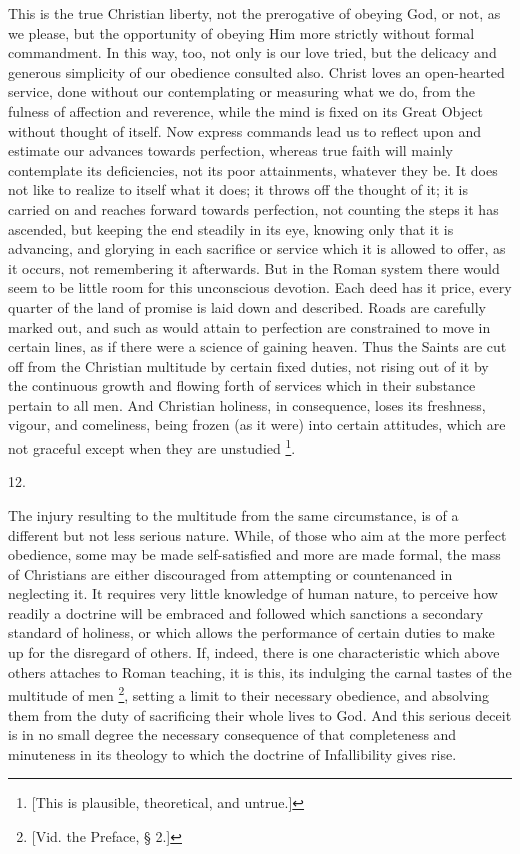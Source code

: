 This is the true Christian liberty, not the prerogative of obeying
God, or not, as we please, but the opportunity of obeying Him more
strictly without formal commandment. In this way, too, not only is our
love tried, but the delicacy and generous simplicity of our obedience
consulted also. Christ loves an open-hearted service, done without our
contemplating or measuring what we do, from the fulness of affection
and reverence, while the mind is fixed on its Great Object without
thought of itself. Now express commands lead us to reflect upon and
estimate our advances towards perfection, whereas true faith will
mainly contemplate its deficiencies, not its poor attainments,
whatever they be. It does not like to realize to itself what it does;
it throws off the thought of it; it is carried on and reaches forward
towards perfection, not counting the steps it has ascended, but
keeping the end steadily in its eye, knowing only that it is
advancing, and glorying in each sacrifice or service which it is
allowed to offer, as it occurs, not remembering it afterwards. But in
the Roman system there would seem to be little room for this
unconscious devotion. Each deed has it price, every quarter of the
land of promise is laid down and described. Roads are carefully marked
out, and such as would attain to perfection are constrained to move in
certain lines, as if there were a science of gaining heaven. Thus the
Saints are cut off from the Christian multitude by certain fixed
duties, not rising out of it by the continuous growth and flowing
forth of services which in their substance pertain to all men. And
Christian holiness, in consequence, loses its freshness, vigour, and
comeliness, being frozen (as it were) into certain attitudes, which
are not graceful except when they are unstudied \footnote{[This is plausible, theoretical, and
untrue.]}.

12.

The injury resulting to the multitude from the same circumstance,
is of a different but not less serious nature. While, of those who aim
at the more perfect obedience, some may be made self-satisfied and
more are made formal, the mass of Christians are either discouraged
from attempting or countenanced in neglecting it. It requires very
little knowledge of human nature, to perceive how readily a doctrine
will be embraced and followed which sanctions a secondary standard of
holiness, or which allows the performance of certain duties to make up
for the disregard of others. If, indeed, there is one characteristic
which above others attaches to Roman teaching, it is this, its
indulging the carnal tastes of the multitude of men \footnote{[Vid. the Preface, § 2.]}, setting a limit to their necessary obedience, and absolving
them from the duty of sacrificing their whole lives to God. And
this serious deceit is in no small degree the necessary consequence of
that completeness and minuteness in its theology to which the doctrine
of Infallibility gives rise.

